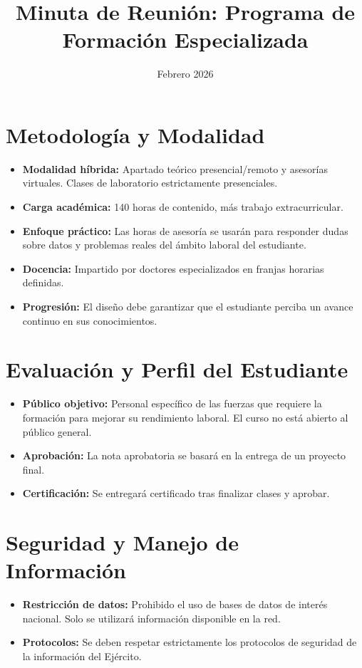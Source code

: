 \documentclass[11pt,a4paper]{article}
\title{\textbf{Minuta de Reunión: Programa de Formación Especializada}}
\author{}
\date{Febrero 2026}
\begin{document}
\maketitle
\vspace{-1.5cm}

\section{Metodología y Modalidad}
\begin{itemize}[noitemsep]
    \item \textbf{Modalidad híbrida:} Apartado teórico presencial/remoto y asesorías virtuales. Clases de laboratorio estrictamente presenciales.
    \item \textbf{Carga académica:} 140 horas de contenido, más trabajo extracurricular.
    \item \textbf{Enfoque práctico:} Las horas de asesoría se usarán para responder dudas sobre datos y problemas reales del ámbito laboral del estudiante.
    \item \textbf{Docencia:} Impartido por doctores especializados en franjas horarias definidas.
    \item \textbf{Progresión:} El diseño debe garantizar que el estudiante perciba un avance continuo en sus conocimientos.
\end{itemize}

\section{Evaluación y Perfil del Estudiante}
\begin{itemize}[noitemsep]
    \item \textbf{Público objetivo:} Personal específico de las fuerzas que requiere la formación para mejorar su rendimiento laboral. El curso no está abierto al público general.
    \item \textbf{Aprobación:} La nota aprobatoria se basará en la entrega de un proyecto final.
    \item \textbf{Certificación:} Se entregará certificado tras finalizar clases y aprobar.
\end{itemize}

\section{Seguridad y Manejo de Información}
\begin{itemize}[noitemsep]
    \item \textbf{Restricción de datos:} Prohibido el uso de bases de datos de interés nacional. Solo se utilizará información disponible en la red.
    \item \textbf{Protocolos:} Se deben respetar estrictamente los protocolos de seguridad de la información del Ejército.
\end{itemize}
\end{document}
